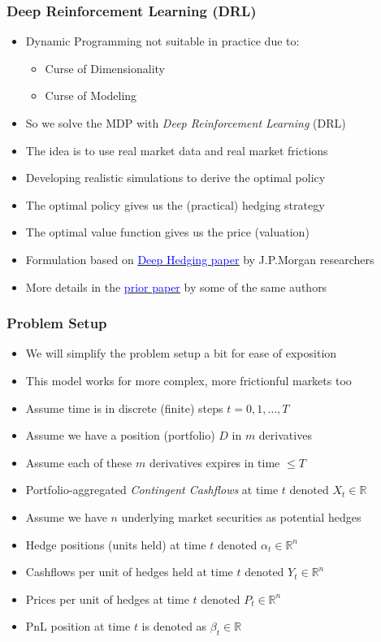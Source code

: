 \documentclass[handout]{beamer}
\begin{document}
\begin{frame}
\frametitle{Deep Reinforcement Learning (DRL)}
\pause
\begin{itemize}[<+->]
\item Dynamic Programming not suitable in practice due to:
\begin{itemize}
\item Curse of Dimensionality
\item Curse of Modeling
\end{itemize}
\item So we solve the MDP with {\em Deep Reinforcement Learning} (DRL)
\item The idea is to use real market data and real market frictions
\item Developing realistic simulations to derive the optimal policy
\item The optimal policy gives us the (practical) hedging strategy
\item The optimal value function gives us the price (valuation)
\item Formulation based on \href{https://papers.ssrn.com/sol3/papers.cfm?abstract_id=3355706}{\underline{\textcolor{blue}{Deep Hedging paper}}} by J.P.Morgan researchers
\item More details in the \href{https://papers.ssrn.com/sol3/papers.cfm?abstract_id=3355706}{\underline{\textcolor{blue}{prior paper}}} by some of the same authors
\end{itemize}
\end{frame}

\begin{frame}
\frametitle{Problem Setup}
\pause
\begin{itemize}[<+->]
\item We will simplify the problem setup a bit for ease of exposition
\item This model works for more complex, more frictionful markets too
\item Assume time is in discrete (finite) steps $t = 0, 1, \ldots, T$
\item Assume we have a position (portfolio) $D$ in $m$ derivatives
\item Assume each of these $m$ derivatives expires in time $ \leq T$
\item Portfolio-aggregated {\em Contingent Cashflows} at time $t$ denoted $X_t \in \mathbb{R}$
\item Assume we have $n$ underlying market securities as potential hedges
\item Hedge positions (units held) at time $t$ denoted $\alpha_t \in \mathbb{R}^n$
\item Cashflows per unit of hedges held at time $t$ denoted $Y_t \in \mathbb{R}^n$
\item Prices per unit of hedges at time $t$ denoted $P_t \in \mathbb{R}^n$
\item PnL position at time $t$ is denoted as $\beta_t \in \mathbb{R}$
\end{itemize}
\end{frame}
\end{document}

